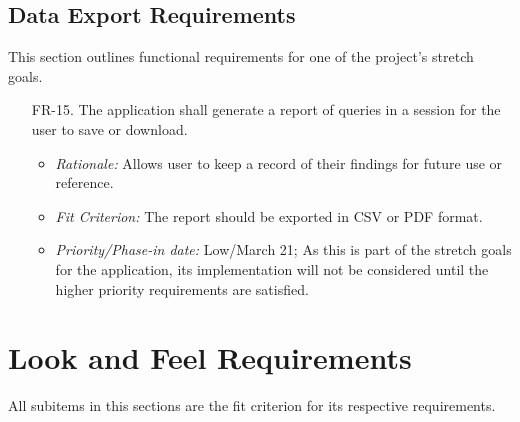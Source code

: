 \documentclass[12pt]{article}
\begin{document}
\subsection{Data Export Requirements}
This section outlines functional requirements for one of the project's stretch goals.
\begin{enumerate}
  \item[FR-15.] The application shall generate a report of queries in a session for the user to save or download.
  \begin{itemize}
    \item \textit{Rationale:} Allows user to keep a record of their findings for future use or reference.
    \item \textit{Fit Criterion:} The report should be exported in CSV or PDF format.
    \item \textit{Priority/Phase-in date:} Low/March 21; As this is part of the stretch goals for the application, its implementation will not be considered until the higher priority requirements are satisfied.
  \end{itemize}
\end{enumerate}

\section{Look and Feel Requirements}
All subitems in this sections are the fit criterion for its respective requirements. 
\end{document}
